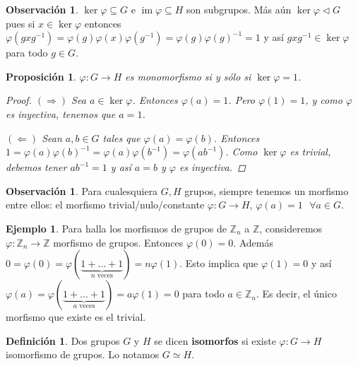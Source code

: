 \documentclass[12pt]{book}
\newtheorem{prop}[teo]{Proposición}
\theoremstyle{definition}
\newtheorem{obs}[teo]{Observación}
\newtheorem{defn}[teo]{Definición}
\newtheorem{ex}[teo]{Ejemplo}
\newcommand{\ZZ}{\mathbb{Z}}      %
\DeclareMathOperator{\im}{im}
\begin{document}
\begin{obs}
$\ker \varphi \subseteq G$ e $\im \varphi\subseteq H$ son subgrupos. Más aún $\ker \varphi \triangleleft G$ pues si $x\in\ker \varphi$ entonces $\varphi(gxg^{-1}) = \varphi(g)\varphi(x)\varphi(g^{-1}) = \varphi(g)\varphi(g)^{-1}= 1$ y así $gxg^{-1}\in\ker \varphi$ para todo $g\in G$.
\end{obs}

\begin{prop}
$\varphi:G\to H$ es monomorfismo si y sólo si $\ker \varphi = 1$.
\begin{proof}
$(\Longrightarrow)$ Sea $a\in\ker\varphi$. Entonces $\varphi(a)=1$. Pero $\varphi(1)=1$, y como $\varphi$ es inyectiva, tenemos que $a=1$.

$(\Longleftarrow)$ Sean $a,b\in G$ tales que $\varphi(a)=\varphi(b)$. Entonces $1 = \varphi(a)\varphi(b)^{-1} = \varphi(a)\varphi(b^{-1})=\varphi(ab^{-1})$. Como $\ker\varphi$ es trivial, debemos tener $ab^{-1}=1$ y así $a=b$ y $\varphi$ es inyectiva.
\end{proof}
\end{prop}

\begin{obs}
Para cualesquiera $G,H$ grupos, siempre tenemos un morfismo entre ellos: el morfismo trivial/nulo/constante $\varphi:G\to H$, $\varphi(a)=1 \text{ }\forall a\in G$.
\end{obs}

\begin{ex} Para halla los morfismos de grupos de $\ZZ_n$ a $\ZZ$, consideremos $\varphi:\ZZ_n\to\ZZ$ morfismo de grupos. Entonces $\varphi(0)=0$. 
Además $0=\varphi(0)=\varphi(\underbrace{1+\ldots+1}_{n \text{ veces}}) = n\varphi(1)$. Esto implica que $\varphi(1)=0$ y así $\varphi(a) = \varphi(\underbrace{1+\ldots+1}_{a\text{ veces}})= a\varphi(1) = 0$ para todo $a\in\ZZ_n$. Es decir, el único morfismo que existe es el trivial.\end{ex}

\begin{defn}
Dos grupos $G$ y $H$ se dicen \textbf{isomorfos} si existe $\varphi:G\to H$ isomorfismo de grupos. Lo notamos $G\simeq H$.
\end{defn}
\end{document}
